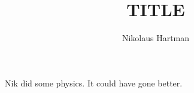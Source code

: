\documentclass[12pt,oneside,final]{thesis}
\begin{document}
\title{TITLE}
\author{Nikolaus Hartman}
\dissertation
\doctorphilosophy
\copyrightnotice %


\appendix





\begin{vita}


Nik did some physics. It could have gone better.
\end{vita}
\end{document}
